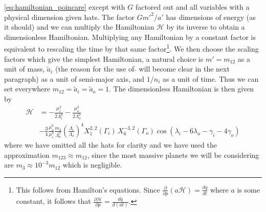 \documentclass[ twoside,openright,titlepage,numbers=noenddot,headinclude,%
                footinclude=true,cleardoublepage=empty,abstractoff, %
                BCOR=5mm,paper=a4,fontsize=11pt,%
                american,%
                ]{scrreprt}
\begin{document}
\cref{eq:hamiltonian_poincare} except with $G$ factored out and all 
variables with a physical dimension given hats. The factor $Gm'^2/a'$ 
has dimensions of energy (as it should) and we can multiply the 
Hamiltonian $\mathcal{H}$ by its inverse to obtain a dimensionless 
Hamiltonian. Multiplying any Hamiltonian by a constant factor is 
equivalent to rescaling the time by that same factor\footnote{
    This follows from Hamilton's equations. Since 
    $\frac{\partial}{\partial p} (a
    \mathcal{H})= \frac{dq}{dt}$ where $a$ is some 
    constant, it follows that
$ \frac{\partial\mathcal{H}}{\partial p} = \frac{dq}{d(at)}$.}.
We then choose the scaling factors which give the simplest Hamiltonian,
a natural choice is $m'=m_{12}$ as a unit of mass, $\tilde{a}_i$ (the
reason for the use
of $\tilde{}$ will become clear in the next paragraph) as a unit of 
semi-major axis, and $1/n_i$ as a unit of time. Thus we can set
everywhere $m_{12}=\tilde{a}_i=\tilde{a}_o=1$. The dimensionless
Hamiltonian is then given by
\begin{equation}
    \begin{aligned}
        \mathcal{H}&=-\frac{\mu_i^3}{2\Lambda_i^2}  
        -\frac{\mu_o^3}{2\Lambda_o^2}\\ 
        &-\frac{3}{4} \frac{\mu_o^6}{\mu_i^3} 
       \frac{m_3}{\Lambda_o^2} \left(\frac{\Lambda_i}{\Lambda_o}\right)^4
    X^{2,2}_1(\Gamma_i)\,X^{-3,2}_6(\Gamma_o)\cos(\lambda_i-6\lambda_o
    -\gamma_i - 4\gamma_o)
    \end{aligned}
    \label{eq:hamiltonian_poincare_dimensionless}
\end{equation}
where we have omitted all the hats for clarity and we have used the 
approximation $m_{123}\approx m_{12}$, since the most massive planets
we will be considering are $m_3\approx 10^{-3} m_{12}$ which is negligible.
\end{document}
